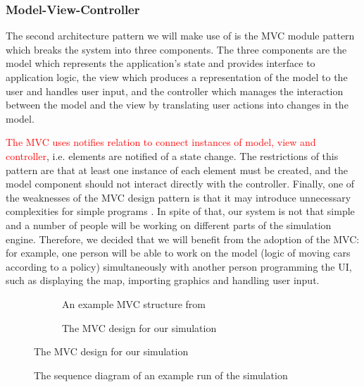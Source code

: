 \documentclass{article}
\begin{document}
\subsubsection{Model-View-Controller}
The second architecture pattern we will make use of is the MVC module pattern which breaks the system into three components. 
The three components are the model which represents the application's state and provides interface to application logic, the view which produces a representation of the model to the user and handles user input, and the controller which manages the interaction between the model and the view by translating user actions into changes in the model. 

\textcolor{red}{The MVC uses notifies relation to connect instances of model, view and controller}, i.e. elements are notified of a state change. 
The restrictions of this pattern are that at least one instance of each element must be created, and the model component should not interact directly with the controller. 
Finally, one of the weaknesses of the MVC design pattern is that it may introduce unnecessary complexities for simple programs \cite{bass2007software}. 
In spite of that, our system is not that simple and a number of people will be working on different parts of the simulation engine. Therefore, we decided that we will benefit from the adoption of the MVC: for example, one person will be able to work on the model (logic of moving cars according to a policy) simultaneously with another person programming the UI, such as displaying the map, importing graphics and handling user input. 

   \begin{figure}[p]
   	\centering
   	   	\begin{subfigure}{\textwidth}
   	   		\centering
   	   		\caption{An example MVC structure from \cite{bass2007software}}
   	   	\end{subfigure}	
   	   	\par \bigskip
   	\begin{subfigure}{\textwidth}
   		\centering
   		\caption{The MVC design for our simulation}
   		\label{OurMvc}
   	\end{subfigure}
   	

   	   \end{figure}
   	
   	\begin{figure}
   		\vspace{-35pt}
   		\centering
   		\caption{The sequence diagram of an example run of the simulation}
   		\label{SequenceDiagram}
   	\end{figure}
   	
\end{document}
